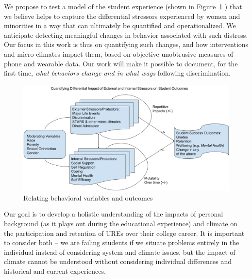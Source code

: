 We  propose to test a model of the student experience (shown in Figure~\ref{fig:model} ) that we believe helps to capture the differential stressors experienced by women and minorities in a way that can ultimately be quantified and operationalized. We anticipate detecting meaningful changes in behavior associated with such distress. Our focus in this work is thus on quantifying such changes, and how interventions and micro-climates impact them, based on objective unobtrusive measures of phone and wearable data. Our work will make it possible to document, for the first time, \textit{what behaviors change and in what ways} following discrimination.  

\begin{figure}
    \centering
    \includegraphics[width=12cm]{img/model2.png}
    \caption{Relating behavioral variables and outcomes}
    \label{fig:model}
\end{figure}

Our goal is to develop a holistic understanding of the impacts of personal background (as it plays out during the educational experience) and climate on the participation and retention of UREs over their college career. It is important to consider both -- we are failing students if we situate problems entirely in the individual instead of considering system and climate issues, but the impact of climate cannot be understood without considering individual differences and historical and current experiences. 

